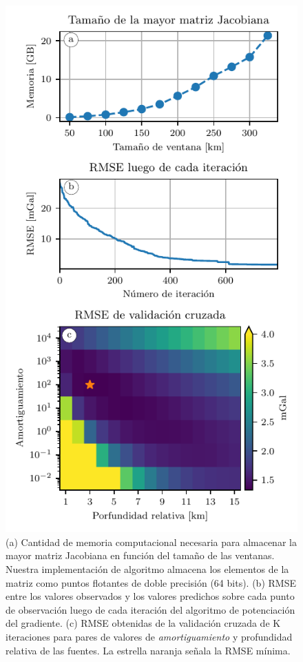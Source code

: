 \begin{figure}
    \centering
    \includegraphics[width=0.6\linewidth]{figs/eql-gradient-boosted/australia-memory-cv-error.pdf}
    \caption{
        (a) Cantidad de memoria computacional necesaria para almacenar la mayor
        matriz Jacobiana en función del tamaño de las ventanas. Nuestra
        implementación de algoritmo almacena los elementos de la matriz como
        puntos flotantes de doble precisión (64 bits).
        (b) \acs{RMSE} entre los valores observados y los valores predichos
        sobre cada punto de observación luego de cada iteración del algoritmo
        de potenciación del gradiente.
        (c) \acs{RMSE} obtenidas de la validación cruzada de K iteraciones para
        pares de valores de \emph{amortiguamiento} y profundidad relativa de
        las fuentes.
        La estrella naranja señala la \acs{RMSE} mínima.
    }
    \label{fig:australia-memory-cv-error}
\end{figure}

